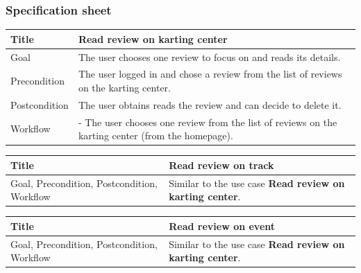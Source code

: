 \documentclass{beamer}
\begin{document}
\begin{frame}
\end{frame}

\begin{frame}
    \frametitle{Specification sheet}
    \begin{table}
        \tiny
        \begin{tabular}{|p{2cm}|p{6cm}|}
        \hline  
        Title & \textbf{Read review on karting center} \\
        \hline
        Goal & The user chooses one review to focus on and reads its details. \\
        \hline
        Precondition & The user logged in and chose a review from the list of reviews on the karting center. \\
        \hline
        Postcondition & The user obtains reads the review and can decide to delete it. \\
        \hline
        Workflow &
        - The user chooses one review from the list of reviews on the karting center (from the homepage). \\
        \hline
        \end{tabular}
    \end{table}

    \begin{table}
        \tiny
        \begin{tabular}{|p{2cm}|p{6cm}|}
        \hline  
        Title & \textbf{Read review on track} \\
        \hline
        Goal, Precondition, Postcondition, Workflow & Similar 
        to the use case \textbf{Read review on karting center}. \\
        \hline
        \end{tabular}
    \end{table}

    \begin{table}
        \tiny
        \begin{tabular}{|p{2cm}|p{6cm}|}
        \hline  
        Title & \textbf{Read review on event} \\
        \hline
        Goal, Precondition, Postcondition, Workflow & Similar 
        to the use case \textbf{Read review on karting center}. \\
        \hline
        \end{tabular}
    \end{table}

\end{frame}
\end{document}
